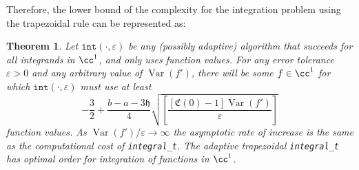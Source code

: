 \documentclass{iitthesis}
\DeclareMathOperator{\Var}{Var}
\newtheorem{theorem}{Theorem}
\theoremstyle{definition}
\theoremstyle{remark}
\begin{document}
Therefore, the lower bound of the complexity for the integration problem using the trapezoidal rule can be represented as:
\begin{theorem} \label{comptrap}
Let $\texttt{int}(\cdot,\varepsilon)$ be any (possibly adaptive) algorithm that succeeds for all integrands in $\cc^1$, and only uses function values. For any error tolerance $\varepsilon > 0$ and any arbitrary value of $\Var(f')$, there will be some $f\in \cc^1$ for which $\texttt{int}(\cdot,\varepsilon)$ must use at least
    \begin{equation}\label{complowbdtrap}
        -\frac{3}{2}+\frac{b-a-3\mathfrak{h}}{4}\sqrt{\left[\frac{[\mathfrak{C}(0)-1]\Var( f')}{\varepsilon}\right]}
    \end{equation}
    function values. As $\Var(f')/\varepsilon \rightarrow \infty$ the asymptotic rate of increase is the same as the computational cost of {\tt integral\_t}. The adaptive trapezoidal {\tt integral\_t} has optimal order for integration of functions in $\cc^1$.
\end{theorem}
\end{document}
